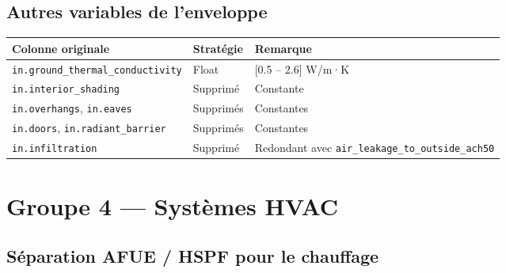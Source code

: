 \documentclass[11pt,a4paper]{article}
\begin{document}
\begin{center}
\end{center}

\subsection{Autres variables de l'enveloppe}

\begin{longtable}{L{5.2cm}L{3cm}L{5.8cm}}
\toprule
\textbf{Colonne originale} & \textbf{Stratégie} & \textbf{Remarque} \\
\midrule
\endhead
{}
\texttt{in.ground\_thermal\_conductivity} & Float & [0.5 – 2.6] W/m·K \\
\texttt{in.interior\_shading} & Supprimé & Constante \\
\texttt{in.overhangs}, \texttt{in.eaves} & Supprimés & Constantes \\
\texttt{in.doors}, \texttt{in.radiant\_barrier} & Supprimés & Constantes \\
\texttt{in.infiltration} & Supprimé & Redondant avec \texttt{air\_leakage\_to\_outside\_ach50} \\
\bottomrule
\end{longtable}

\section{Groupe 4 — Systèmes HVAC}

\subsection{Séparation AFUE / HSPF pour le chauffage}


\end{document}
\end{tabular}
\end{center}
\end{document}
